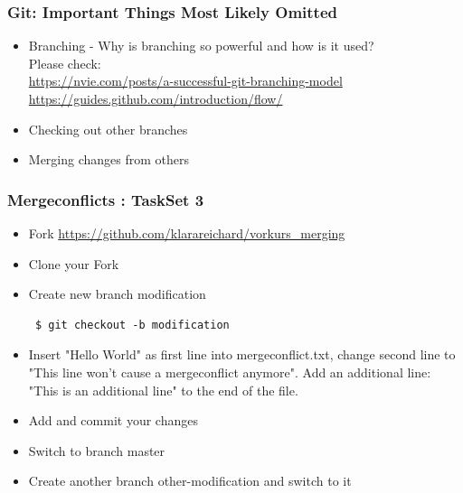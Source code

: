 \documentclass{beamer} %
\begin{document}
\begin{frame}[t, fragile]
\frametitle{Git: Important Things Most Likely Omitted}

\begin{itemize}
    \item Branching - Why is branching so powerful and how is it used? \\
    Please check: \\
    \url{https://nvie.com/posts/a-successful-git-branching-model} \\
    \url{https://guides.github.com/introduction/flow/}
    \item Checking out other branches
    \item Merging changes from others
\end{itemize}


\end{frame}

\begin{frame}[t, fragile]
\frametitle{Mergeconflicts : TaskSet 3}
\begin{itemize}
\item Fork \url{https://github.com/klarareichard/vorkurs_merging}
\item Clone your Fork
\item Create new branch modification \begin{verbatim} 
 $ git checkout -b modification
\end{verbatim}
\item Insert "Hello World" as first line into mergeconflict.txt, change second line to "This line won't cause a mergeconflict anymore". Add an additional line: "This is an additional line" to the end of the file.
\item Add and commit your changes
\item Switch to branch master 
\item Create another branch other-modification and switch to it
\end{itemize}
\end{frame}
\end{document}
